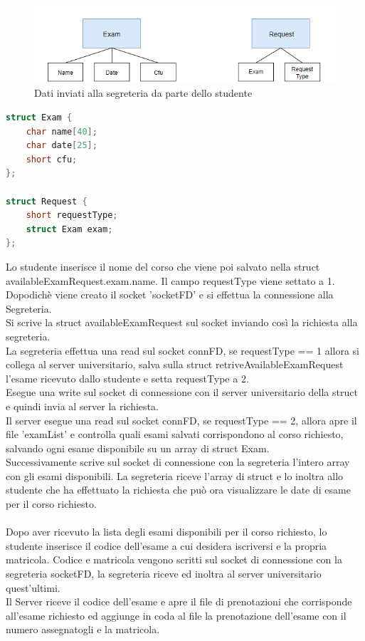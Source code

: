 \documentclass{article}
\begin{document}
\begin{figure}[htp]
    \centering
    \includegraphics[width=1\linewidth]{struct.png}
    \caption{Dati inviati alla segreteria da parte dello studente}
    \label{fig:enter-label}
\end{figure}
\begin{lstlisting}[language=C]
struct Exam {
    char name[40];
    char date[25];
    short cfu;
};

struct Request {
    short requestType;
    struct Exam exam;
};
\end{lstlisting}
Lo studente inserisce il nome del corso che viene poi salvato nella struct availableExamRequest.exam.name.
Il campo requestType viene settato a 1.\\
Dopodichè viene creato il socket 'socketFD' e si effettua la connessione alla Segreteria.\\
Si scrive la struct availableExamRequest sul socket inviando così la richiesta alla segreteria.\\
La segreteria effettua una read sul socket connFD, se requestType == 1 allora si collega al server universitario, salva sulla struct retriveAvailableExamRequest l'esame ricevuto dallo studente e setta requestType a 2.\\
Esegue una write sul socket di connessione con il server universitario della struct e quindi invia al server la richiesta.\\
Il server esegue una read sul socket connFD, se requestType == 2, allora apre il file 'examList' e controlla quali esami salvati corrispondono al corso richiesto, salvando ogni esame disponibile su un array di struct Exam.\\
Successivamente scrive sul socket di connessione con la segreteria l'intero array con gli esami disponibili.
La segreteria riceve l'array di struct e lo inoltra allo studente che ha effettuato la richiesta che può ora visualizzare le date di esame per il corso richiesto.\\\\
Dopo aver ricevuto la lista degli esami disponibili per il corso richiesto, lo studente inserisce il codice dell'esame a cui desidera iscriversi e la propria matricola.
Codice e matricola vengono scritti sul socket di connessione con la segreteria socketFD, la segreteria riceve ed inoltra al server universitario quest'ultimi.\\
Il Server riceve il codice dell'esame e apre il file di prenotazioni che corrisponde all'esame richiesto ed aggiunge in coda al file la prenotazione dell'esame con il numero assegnatogli e la matricola.\\
\end{document}
